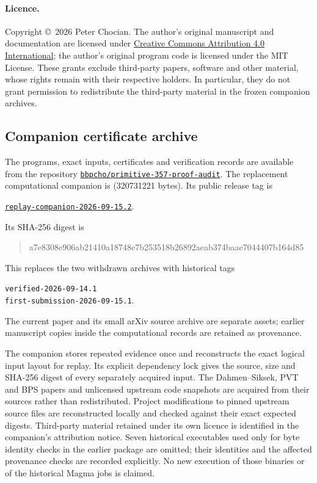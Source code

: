 \documentclass[11pt]{article}
\theoremstyle{definition}
\theoremstyle{remark}
\begin{document}
\paragraph{Licence.}
Copyright \copyright\ 2026 Peter Chocian.  The author's original manuscript
and documentation are licensed under
\href{https://creativecommons.org/licenses/by/4.0/}{Creative Commons
Attribution 4.0 International}; the author's original program code is
licensed under the MIT License.  These grants exclude third-party papers,
software and other material, whose rights remain with their respective
holders.  In particular, they do not grant permission to redistribute
the third-party material in the frozen companion archives.

\subsection{Companion certificate archive}

The programs, exact inputs, certificates and verification records
are available from the repository
\href{https://github.com/bbpcho/primitive-357-proof-audit}{\texttt{bbpcho/primitive-357-proof-audit}}.
The replacement computational companion is
(320731221 bytes). Its public release tag is
\begin{center}
\href{https://github.com/bbpcho/primitive-357-proof-audit/releases/tag/replay-companion-2026-09-15.2}{\texttt{replay-companion-2026-09-15.2}}.
\end{center}
Its SHA-256 digest is
\begin{quote}\small\ttfamily
a7e8308e906ab21410a18748e7b253518b26892aeab374baae7044407b164d85
\end{quote}
This replaces the two withdrawn archives with historical tags
\begin{center}\small
\texttt{verified-2026-09-14.1}\\
\texttt{first-submission-2026-09-15.1}.
\end{center}
The current paper and its small
arXiv source archive are separate assets; earlier manuscript copies
inside the computational records are retained as provenance.

The companion stores repeated evidence once and reconstructs the exact
logical input layout for replay. Its explicit dependency lock gives the
source, size and SHA-256 digest of every separately acquired input.
The Dahmen--Siksek, PVT and BPS papers and unlicensed upstream code
snapshots are acquired from their sources rather than redistributed.
Project modifications to pinned upstream source files are reconstructed
locally and checked against their exact expected digests. Third-party
material retained under its own licence is identified in the companion's
attribution notice. Seven historical executables used only for byte
identity checks in the earlier package are omitted; their identities and
the affected provenance checks are recorded explicitly. No new execution
of those binaries or of the historical Magma jobs is claimed.
\end{document}
